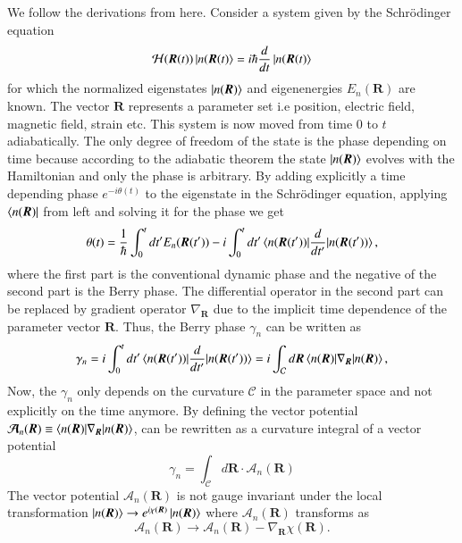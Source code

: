 \documentclass[a4paper,11pt]{report}
\begin{document}
We follow the derivations from \cite[p.7 - p.14]{Bernevig2013} here. Consider a system given by the Schrödinger equation
\begin{equation}
 \mathcal{H}(\bm{R}(t))\ket{n(\bm{R}(t)} = i\hbar\frac{d}{dt}\ket{n(\bm{R}(t)}
\end{equation}
for which the normalized eigenstates $\ket{n(\bm{R})}$ and eigenenergies $E_n(\bm{R})$ are known. The vector $\bm{R}$ represents a parameter set i.e 
position, electric field, magnetic field, strain etc. This system is now moved from time 0 to $t$ adiabatically. The only degree of freedom of the
state is the phase depending on time because according to the adiabatic theorem the state $\ket{n(\bm{R})}$ evolves with the Hamiltonian and only the
phase is arbitrary. By adding
explicitly a time depending phase $e^{-i\theta(t)}$ to the eigenstate in the Schrödinger equation, applying $\bra{n(\bm{R})}$ from left and solving it for the phase we get
\begin{equation}
 \theta(t) = \frac{1}{\hbar}\int_0^t dt^\prime E_n(\bm{R}(t^\prime)) 
 - i\int_0^t dt^\prime\braket{n(\bm{R}(t^\prime))|\frac{d}{dt^\prime}|n(\bm{R}(t^\prime))},
\end{equation}
where the first part is the conventional dynamic phase and the negative of the second part is the Berry phase. The differential operator in
the second part can be replaced by gradient operator $\nabla_{\bm{R}}$ due to the implicit time dependence of the parameter vector $\bm{R}$. Thus,
the Berry phase $\gamma_n$ can be written as
\begin{equation}\label{eq:1}
 \gamma_n = i\int_0^t dt^\prime\braket{n(\bm{R}(t^\prime))|\frac{d}{dt^\prime}|n(\bm{R}(t^\prime))} 
 = i\int_\mathcal{C} d\bm{R}\braket{n(\bm{R})|\nabla_{\bm{R}}|n(\bm{R})},
\end{equation}
Now, the $\gamma_n$ only depends on the curvature $\mathcal{C}$ in the parameter space and not explicitly on the time anymore. By defining the vector
potential $\bm{\mathcal{A}}_n(\bm{R}) \equiv \braket{n(\bm{R})|\nabla_{\bm{R}}|n(\bm{R})}$,  can be rewritten as a curvature
integral of a vector potential
\begin{equation}\label{eq:2}
 \gamma_n = \int_\mathcal{C} d\bm{R}\cdot\bm{\mathcal{A}}_n(\bm{R})
\end{equation}
The vector potential $\bm{\mathcal{A}}_n(\bm{R})$ is not gauge invariant under the local transformation 
$\ket{n(\bm{R})} \rightarrow e^{i\chi(\bm{R})}\ket{n(\bm{R})}$ where $\bm{\mathcal{A}}_n(\bm{R})$ transforms as
\begin{equation}\nonumber
 \bm{\mathcal{A}}_n(\bm{R}) \rightarrow \bm{\mathcal{A}}_n(\bm{R}) - \nabla_{\bm{R}}\chi(\bm{R}).
\end{equation}
\end{document}
